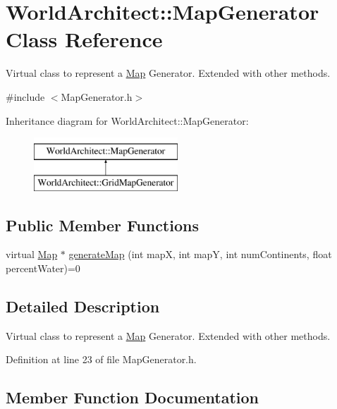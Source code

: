 \hypertarget{class_world_architect_1_1_map_generator}{}\section{World\+Architect\+::Map\+Generator Class Reference}
\label{class_world_architect_1_1_map_generator}


Virtual class to represent a \mbox{\hyperlink{class_world_architect_1_1_map}{Map}} Generator. Extended with other methods.  




{\ttfamily \#include $<$Map\+Generator.\+h$>$}

Inheritance diagram for World\+Architect\+::Map\+Generator\+:\begin{figure}[H]
\begin{center}
\leavevmode
\includegraphics[height=2.000000cm]{class_world_architect_1_1_map_generator}
\end{center}
\end{figure}
\subsection*{Public Member Functions}
\begin{DoxyCompactItemize}
\item 
virtual \mbox{\hyperlink{class_world_architect_1_1_map}{Map}} $\ast$ \mbox{\hyperlink{class_world_architect_1_1_map_generator_a0b9c37985de91e45501f69785a9dde8f}{generate\+Map}} (int mapX, int mapY, int num\+Continents, float percent\+Water)=0
\end{DoxyCompactItemize}


\subsection{Detailed Description}
Virtual class to represent a \mbox{\hyperlink{class_world_architect_1_1_map}{Map}} Generator. Extended with other methods. 

Definition at line 23 of file Map\+Generator.\+h.



\subsection{Member Function Documentation}
\mbox{\label{class_world_architect_1_1_map_generator_a0b9c37985de91e45501f69785a9dde8f}} 
